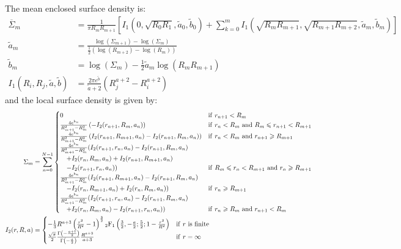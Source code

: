 \documentclass[usenatbib]{mnras}
\begin{document}
The mean enclosed surface density is:
\begin{align}
  \overline{\Sigma}_m &= \frac{1}{\pi R_mR_{m+1}}\left[I_1(0, \sqrt{R_0R_1}, \tilde{a}_0, \tilde{b}_0) + 
\sum_{k=0}^m I_1(\sqrt{R_mR_{m+1}},\sqrt{R_{m+1}R_{m+2}}, \tilde{a}_m, \tilde{b}_m)\right]\\
  \tilde{a}_m &= \frac{\log(\Sigma_{m+1})-\log(\Sigma_m)}{\frac{1}{2}\left(\log(R_{m+2})-\log(R_m)\right)}\\
  \tilde{b}_m &= \log(\Sigma_m) - \frac{1}{2}\tilde{a}_m\log(R_mR_{m+1})\\
  I_1(R_i,R_j,\tilde{a},\tilde{b}) &= \frac{2\pi e^{\tilde{b}}}{\tilde{a}+2}\left(R_j^{a+2} - R_i^{a+2}\right)
\end{align}
\noindent and the local surface density is given by:
\begin{align}
  \Sigma_m &= \sum_{n=0}^{N-1}
  \begin{cases}
    0 & {\rm if}\ r_{n+1} < R_m\\
    \frac{4e^{b_n}}{R_{m+1}^2-R_m^2} \left(-I_2(r_{n+1},R_m,a_n)\right) & {\rm if}\ r_n < R_m\ {\rm and}\ R_m \leq r_{n+1} < R_{m+1}\\
    \frac{4e^{b_n}}{R_{m+1}^2-R_m^2} \left(I_2(r_{n+1},R_{m+1},a_n)-I_2(r_{n+1},R_m,a_n)\right) & {\rm if}\ r_n < R_m\ {\rm and}\ r_{n+1} \geq R_{m+1}\\
    \frac{4e^{b_n}}{R_{m+1}^2-R_m^2} (I_2(r_{n+1},r_n,a_n)-I_2(r_{n+1},R_m,a_n)\\ \quad +I_2(r_n,R_m,a_n)+I_2(r_{n+1},R_{m+1},a_n)\\ \quad -I_2(r_{n+1},r_n,a_n)) & {\rm if}\ R_m \leq r_n < R_{m+1}\ {\rm and}\ r_n \geq R_{m+1}\\
    \frac{4e^{b_n}}{R_{m+1}^2-R_m^2} (I_2(r_{n+1},R_{m+1},a_n)-I_2(r_{n+1},R_m,a_n)\\ \quad -I_2(r_n,R_{m+1},a_n)+I_2(r_n,R_m,a_n)) & {\rm if}\ r_n \geq R_{m+1}\\
    \frac{4e^{b_n}}{R_{m+1}^2-R_m^2} (I_2(r_{n+1},r_n,a_n)-I_2(r_{n+1},R_m,a_n)\\ \quad +I_2(r_n,R_m,a_n)-I_2(r_{n+1},r_n,a_n)) & {\rm if}\ r_n \geq R_m\ {\rm and}\ r_{n+1} < R_m\\
  \end{cases}\\
  I_2(r,R,a) &=
  \begin{cases}
    -\frac{1}{3}R^{a+3}\left(\frac{r^2}{R^2}-1\right)^{\frac{3}{2}}{}_2{\rm F}_1\left(\frac{3}{2},-\frac{a}{2};\frac{5}{2};1-\frac{r^2}{R^2}\right) & {\rm if}\ r\ {\rm is}\ {\rm finite}\\
    \frac{\sqrt{\pi}}{2}\frac{\Gamma\left(-\frac{a+1}{2}\right)}{\Gamma\left(-\frac{a}{2}\right)}\frac{R^{a+3}}{a+3} & {\rm if}\ r=\infty
  \end{cases}
\end{align}
\end{document}
